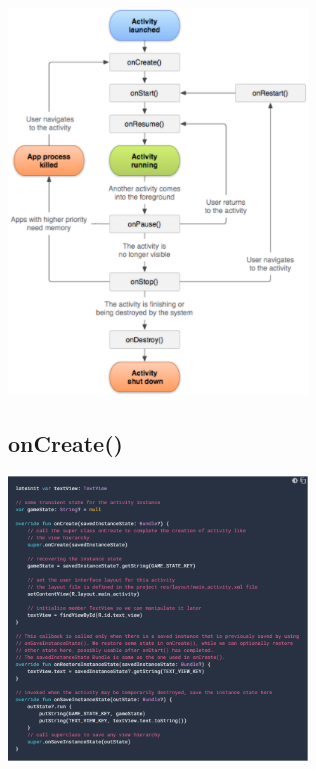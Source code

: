 \documentclass{report}
\newenvironment{Figure}
	{\par\medskip\noindent\minipage{\linewidth}}
	{\endminipage\par\medskip}
\theoremstyle{definition}
\theoremstyle{example}
\begin{document}
\begin{Figure}
   \centering
    \includegraphics[width=300px]{img/ActivityLifecycle.png}
        \label{fig:Activity Lifecycle}
\end{Figure}
\subsection{onCreate()}
\begin{Figure}
   \centering
    \includegraphics[width=300px]{img/onCreate.png}
        \label{fig:Code Snippet Create Activity Lifecycle onCreate()}
\end{Figure}
\end{document}
